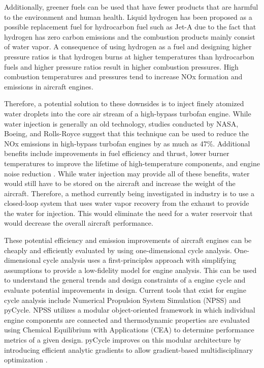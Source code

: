 \documentclass[conf]{new-aiaa}
\begin{document}
Additionally, greener fuels can be used that have fewer products that are harmful to the environment and human health.
Liquid hydrogen has been proposed as a possible replacement fuel for hydrocarbon fuel such as Jet-A due to the fact that hydrogen has zero carbon emissions and the combustion products mainly consist of water vapor.
A consequence of using hydrogen as a fuel and designing higher pressure ratios is that hydrogen burns at higher temperatures than hydrocarbon fuels and higher pressure ratios result in higher combustion pressures.
High combustion temperatures and pressures tend to increase NOx formation and emissions in aircraft engines.

Therefore, a potential solution to these downsides is to inject finely atomized water droplets into the core air stream of a high-bypass turbofan engine.
While water injection is generally an old technology, studies conducted by NASA, Boeing, and Rolls-Royce suggest that this technique can be used to reduce the NOx emissions in high-bypass turbofan engines by as much as 47\%.
Additional benefits include improvements in fuel efficiency and thrust, lower burner temperatures to improve the lifetime of high-temperature components, and engine noise reduction \cite{nasa_inject}.
While water injection may provide all of these benefits, water would still have to be stored on the aircraft and increase the weight of the aircraft.
Therefore, a method currently being investigated in industry is to use a closed-loop system that uses water vapor recovery from the exhaust to provide the water for injection.
This would eliminate the need for a water reservoir that would decrease the overall aircraft performance.

These potential efficiency and emission improvements of aircraft engines can be cheaply and efficiently evaluated by using one-dimensional cycle analysis.
One-dimensional cycle analysis uses a first-principles approach with simplifying assumptions to provide a low-fidelity model for engine analysis.
This can be used to understand the general trends and design constraints of a engine cycle and evaluate potential improvements in design. Current tools that exist for engine cycle analysis include Numerical Propulsion System Simulation (NPSS) and pyCycle.
NPSS utilizes a modular object-oriented framework in which individual engine components are connected and thermodynamic properties are evaluated using Chemical Equilibrium with Applications (CEA) to determine performance metrics of a given design.
pyCycle improves on this modular architecture by introducing efficient analytic gradients to allow gradient-based multidisciplinary optimization \cite{Hendricks2019}.
\end{document}

